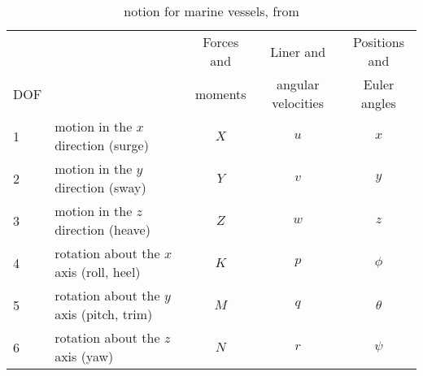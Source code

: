 \begin{table}[htbp]
	\centering
	\begin{tabular}{llccc}
		\toprule
		    & & Forces and & Liner and          & Positions and  \\
		DOF & & moments    & angular velocities & Euler angles   \\ 
		\midrule
		1 & motion in the $x$ direction (surge)       & $X$ & $u$ & $x$ \\
		2 & motion in the $y$ direction (sway)       & $Y$ & $v$ & $y$ \\
		3 & motion in the $z$ direction (heave)       & $Z$ & $w$ & $z$ \\
		4 & rotation about the $x$ axis (roll, heel)  & $K$ & $p$ & $\phi$ \\
		5 & rotation about the $y$ axis (pitch, trim) & $M$ & $q$ & $\theta$ \\
		6 & rotation about the $z$ axis (yaw)         & $N$ & $r$ & $\psi$ \\
		\bottomrule
	\end{tabular}
	\caption{\cite{sname1950} notion for marine vessels, from
	\citep[table~2.1]{fossen}}
	\label{tab:sname}
\end{table}

